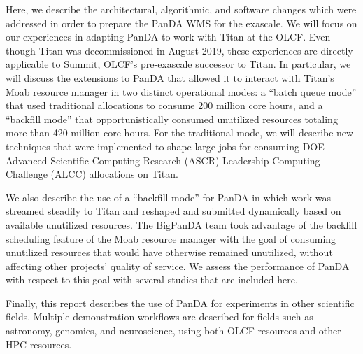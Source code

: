 Here, we describe the architectural, algorithmic, and software changes which
were addressed in order to prepare the PanDA WMS for the exascale. We will
focus on our experiences in adapting PanDA to work with Titan at the OLCF. Even
though Titan was decommissioned in August 2019, these experiences are directly
applicable to Summit, OLCF's pre-exascale successor to Titan. In particular, we
will discuss the extensions to PanDA that allowed it to interact with Titan's
Moab resource manager in two distinct operational modes: a ``batch queue mode''
that used traditional allocations to consume 200 million core hours, and a
``backfill mode'' that opportunistically consumed unutilized resources totaling
more than 420 million core hours. For the traditional mode, we will describe
new techniques that were implemented to shape large jobs for consuming DOE
Advanced Scientific Computing Research (ASCR) Leadership Computing Challenge
(ALCC) allocations on Titan.

We also describe the use of a ``backfill mode'' for PanDA in which work was
streamed steadily to Titan and reshaped and submitted dynamically based on
available unutilized resources. The BigPanDA team took advantage of the
backfill scheduling feature of the Moab resource manager with the goal of
consuming unutilized resources that would have otherwise remained unutilized,
without affecting other projects' quality of service. We assess the
performance of PanDA with respect to this goal with several studies that are
included here.

Finally, this report describes the use of PanDA for experiments in other
scientific fields. Multiple demonstration workflows are described for fields
such as astronomy, genomics, and neuroscience, using both OLCF resources and
other HPC resources.

